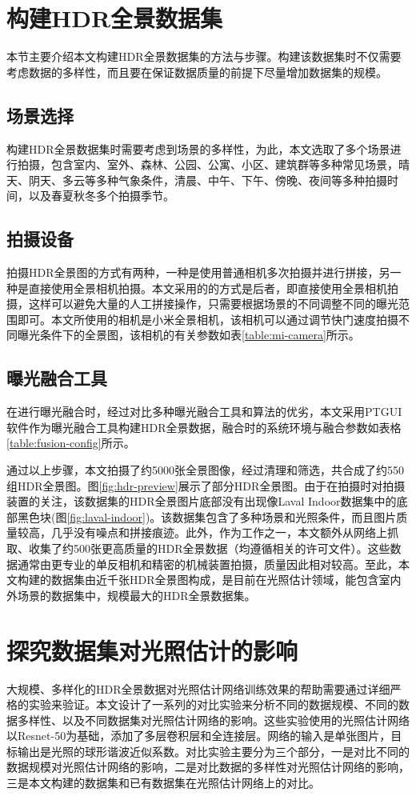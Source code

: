 \section{构建HDR全景数据集}

本节主要介绍本文构建HDR全景数据集的方法与步骤。构建该数据集时不仅需要考虑数据的多样性，而且要在保证数据质量的前提下尽量增加数据集的规模。
\subsection{场景选择}
构建HDR全景数据集时需要考虑到场景的多样性，为此，本文选取了多个场景进行拍摄，包含室内、室外、森林、公园、公寓、小区、建筑群等多种常见场景，晴天、阴天、多云等多种气象条件，清晨、中午、下午、傍晚、夜间等多种拍摄时间，以及春夏秋冬多个拍摄季节。
\subsection{拍摄设备}
拍摄HDR全景图的方式有两种，一种是使用普通相机多次拍摄并进行拼接，另一种是直接使用全景相机拍摄。本文采用的的方式是后者，即直接使用全景相机拍摄，这样可以避免大量的人工拼接操作，只需要根据场景的不同调整不同的曝光范围即可。本文所使用的相机是小米全景相机\cite{xiaomi}，该相机可以通过调节快门速度拍摄不同曝光条件下的全景图，该相机的有关参数如表\ref{table:mi-camera}所示。
\subsection{曝光融合工具}
在进行曝光融合时，经过对比多种曝光融合工具和算法的优劣，本文采用PTGUI软件\cite{ptgui}作为曝光融合工具构建HDR全景数据，融合时的系统环境与融合参数如表格\ref{table:fusion-config}所示。


通过以上步骤，本文拍摄了约5000张全景图像，经过清理和筛选，共合成了约550组HDR全景图。图\ref{fig:hdr-preview}展示了部分HDR全景图。由于在拍摄时对拍摄装置的关注，该数据集的HDR全景图片底部没有出现像Laval Indoor数据集\cite{gardner2017learning}中的底部黑色块(图\ref{fig:laval-indoor})。该数据集包含了多种场景和光照条件，而且图片质量较高，几乎没有噪点和拼接痕迹。此外，作为工作之一，本文额外从网络上抓取、收集了约500张更高质量的HDR全景数据（均遵循相关的许可文件）。这些数据通常由更专业的单反相机和精密的机械装置拍摄，质量因此相对较高。至此，本文构建的数据集由近千张HDR全景图构成，是目前在光照估计领域，能包含室内外场景的数据集中，规模最大的HDR全景数据集。
\section{探究数据集对光照估计的影响}
大规模、多样化的HDR全景数据对光照估计网络训练效果的帮助需要通过详细严格的实验来验证。本文设计了一系列的对比实验来分析不同的数据规模、不同的数据多样性、以及不同数据集对光照估计网络的影响。这些实验使用的光照估计网络以Resnet-50\cite{he2016deep}为基础，添加了多层卷积层和全连接层。网络的输入是单张图片，目标输出是光照的球形谐波近似系数。对比实验主要分为三个部分，一是对比不同的数据规模对光照估计网络的影响，二是对比数据的多样性对光照估计网络的影响，三是本文构建的数据集和已有数据集在光照估计网络上的对比。

